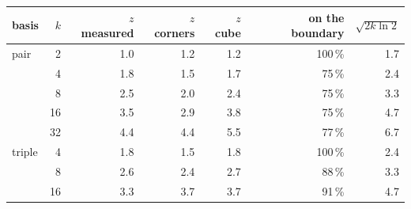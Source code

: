 \footnotesize
\begin{tabular}{lrrrrrr}
\toprule
basis & $k$ & $z$ measured & $z$ corners & $z$ cube & on the boundary & $\sqrt{2k\ln 2}$ \\
\midrule
pair & 2 & 1.0 & 1.2 & 1.2 & 100\,\% & 1.7 \\
 & 4 & 1.8 & 1.5 & 1.7 & 75\,\% & 2.4 \\
 & 8 & 2.5 & 2.0 & 2.4 & 75\,\% & 3.3 \\
 & 16 & 3.5 & 2.9 & 3.8 & 75\,\% & 4.7 \\
 & 32 & 4.4 & 4.4 & 5.5 & 77\,\% & 6.7 \\
triple & 4 & 1.8 & 1.5 & 1.8 & 100\,\% & 2.4 \\
 & 8 & 2.6 & 2.4 & 2.7 & 88\,\% & 3.3 \\
 & 16 & 3.3 & 3.7 & 3.7 & 91\,\% & 4.7 \\
\bottomrule
\end{tabular}
